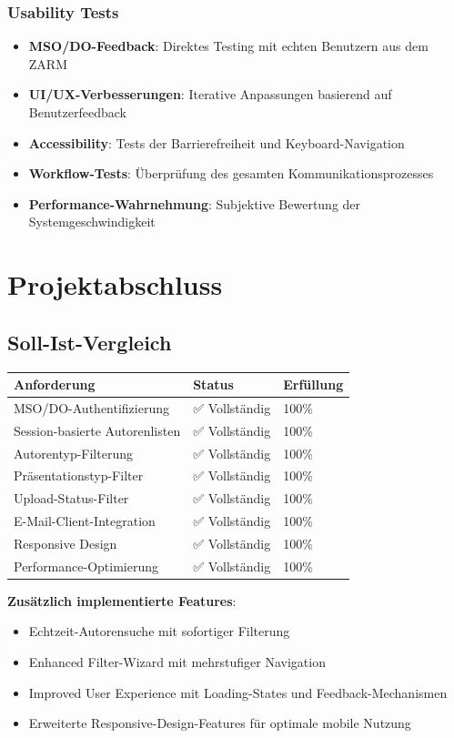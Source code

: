 \documentclass[11pt,a4paper]{article}
\begin{document}
\subsubsection{Usability Tests}
\begin{itemize}
    \item \textbf{MSO/DO-Feedback}: Direktes Testing mit echten Benutzern aus dem ZARM
    \item \textbf{UI/UX-Verbesserungen}: Iterative Anpassungen basierend auf Benutzerfeedback
    \item \textbf{Accessibility}: Tests der Barrierefreiheit und Keyboard-Navigation
    \item \textbf{Workflow-Tests}: Überprüfung des gesamten Kommunikationsprozesses
    \item \textbf{Performance-Wahrnehmung}: Subjektive Bewertung der Systemgeschwindigkeit
\end{itemize}

\newpage
\section{Projektabschluss}

\subsection{Soll-Ist-Vergleich}
\begin{center}
\begin{tabular}{|l|l|l|}
\hline
\textbf{Anforderung} & \textbf{Status} & \textbf{Erfüllung} \\
\hline
MSO/DO-Authentifizierung & ✅ Vollständig & 100\% \\
\hline
Session-basierte Autorenlisten & ✅ Vollständig & 100\% \\
\hline
Autorentyp-Filterung & ✅ Vollständig & 100\% \\
\hline
Präsentationstyp-Filter & ✅ Vollständig & 100\% \\
\hline
Upload-Status-Filter & ✅ Vollständig & 100\% \\
\hline
E-Mail-Client-Integration & ✅ Vollständig & 100\% \\
\hline
Responsive Design & ✅ Vollständig & 100\% \\
\hline
Performance-Optimierung & ✅ Vollständig & 100\% \\
\hline
\end{tabular}
\end{center}

\textbf{Zusätzlich implementierte Features}:
\begin{itemize}
    \item Echtzeit-Autorensuche mit sofortiger Filterung
    \item Enhanced Filter-Wizard mit mehrstufiger Navigation
    \item Improved User Experience mit Loading-States und Feedback-Mechanismen
    \item Erweiterte Responsive-Design-Features für optimale mobile Nutzung
\end{itemize}
\end{document}
